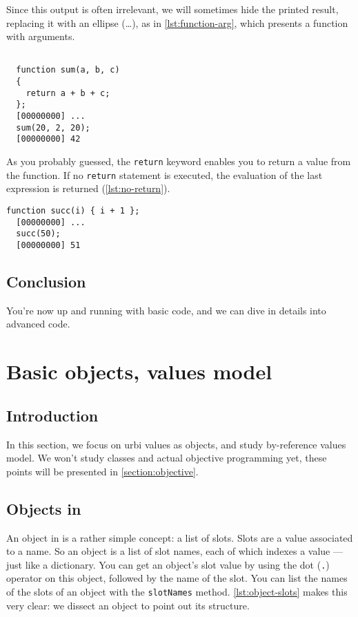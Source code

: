 \documentclass[openright,twoside,12pt]{report}
\begin{document}
Since this output is often irrelevant, we will sometimes hide the
printed result, replacing it with an ellipse (\ldots), as in
\autoref{lst:function-arg}, which presents a function with arguments.

\begin{lstlisting}[caption=Function with
  arguments,label=lst:function-arg]

  function sum(a, b, c)
  {
    return a + b + c;
  };
  [00000000] ...
  sum(20, 2, 20);
  [00000000] 42
\end{lstlisting}

As you probably guessed, the \texttt{return} keyword enables you to
return a value from the function. If no \texttt{return} statement is
executed, the evaluation of the last expression is returned
(\autoref{lst:no-return}).

  \begin{lstlisting}[caption=Return value is the last evaluated value,
    label=lst:no-return]
  function succ(i) { i + 1 };
  [00000000] ...
  succ(50);
  [00000000] 51
\end{lstlisting}

\section{Conclusion}

You're now up and running with basic \urbi code, and we can dive in
details into advanced \urbi code.

\chapter{Basic objects, \urbi values model} %

\section{Introduction}

In this section, we focus on urbi values as objects, and study \urbi
by-reference values model. We won't study classes and actual objective
programming yet, these points will be presented in
\autoref{section:objective}.

\section{Objects in \urbi}

An object in \urbi is a rather simple concept: a list of slots. Slots
are a value associated to a name. So an object is a list of slot
names, each of which indexes a value --- just like a dictionary. You
can get an object's slot value by using the dot (\texttt{.}) operator
on this object, followed by the name of the slot. You can list the
names of the slots of an object with the \texttt{slotNames}
method. \autoref{lst:object-slots} makes this very clear: we dissect an object
to point out its structure.
\end{document}
